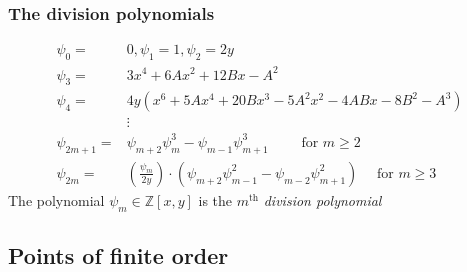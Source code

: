 \documentclass[10pt,handout]{beamer} %
\theoremstyle{definition}
\begin{document}
\begin{frame}\frametitle{The division polynomials}

\begin{Definition}[Division Polynomials of $E:y^2=x^3+Ax+B$ ($p>3$)]\vspace*{-0.7cm}
\begin{align*}
        \psi_{0} =& 0,
        \psi_{1} = 1,
        \psi_{2} = 2y\\
        \psi_{3} =& 3x^{4} + 6Ax^{2} + 12Bx - A^{2}\\
        \psi_{4} =& 4y(x^{6} + 5Ax^{4} + 20Bx^{3} - 5A^{2}x^{2} - 4ABx - 8B^{2} - A^{3}) \\
        &\vdots\\
        \psi_{2m+1} =& \psi_{m+2}\psi_{m}^{3}-\psi_{m-1}\psi^{3}_{m+1} \qquad \text{ for } m \geq 2\\
        \psi_{2m}  =& \left(\frac{\psi_{m}}{2y}\right)\cdot(\psi_{m+2}\psi^{2}_{m-1}-\psi_{m-2}\psi^{2}_{m+1}) \quad \text{ for } m \geq 3
\end{align*}
The polynomial $\psi_m\in{\mathbb Z}[x,y]$ is the $m^{\text{th}}$ \emph{division polynomial}
\end{Definition}\pause
{}
\end{frame}

\subsection{Points of finite order}
\end{document}
